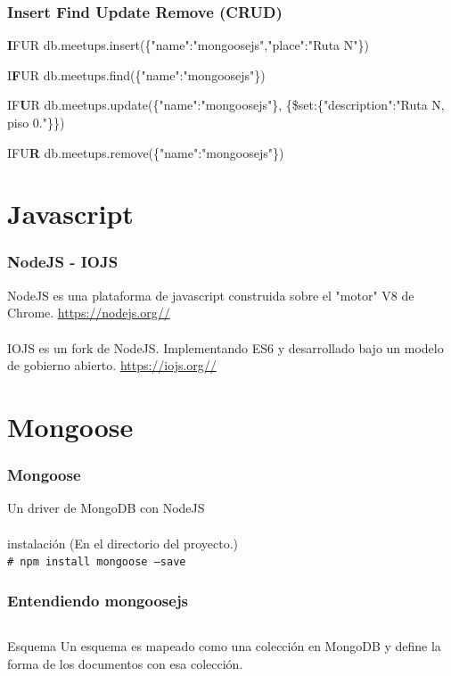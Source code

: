 \documentclass{beamer}
\begin{document}
\begin{frame}
\frametitle{Insert Find Update Remove (CRUD)}
\pause
\begin{block}{\textbf{I}FUR}
db.meetups.insert(\{"name":"mongoosejs","place":"Ruta N"\})
\end{block}
\pause
\begin{block}{I\textbf{F}UR}
db.meetups.find(\{"name":"mongoosejs"\})
\end{block}
\pause
\begin{block}{IF\textbf{U}R}
db.meetups.update(\{"name":"mongoosejs"\},
\{\$set:\{"description":"Ruta N, piso 0."\}\})
\end{block}
\pause
\begin{block}{IFU\textbf{R}}
db.meetups.remove(\{"name":"mongoosejs"\})
\end{block}
\end{frame}

\section{Javascript}
\begin{frame}
\frametitle{NodeJS - IOJS}
NodeJS es una plataforma de javascript construida sobre el "motor" V8 de Chrome.
{\color{blue}\url{https://nodejs.org//}}
\pause
\\~\\
IOJS es un fork de NodeJS. Implementando ES6 y desarrollado bajo un modelo de gobierno abierto.
{\color{blue}\url{https://iojs.org//}}
\end{frame}
\section{Mongoose}
\begin{frame}[fragile]
\frametitle{Mongoose}
Un driver de MongoDB con NodeJS
\pause
\\~\\
\newcommand{\shellcmd}[1]{\\\indent\indent\texttt{\footnotesize\# #1}\\}
  \noindent instalaci\'on (En el directorio del proyecto.)
  \shellcmd{npm install mongoose --save}
\end{frame}

\begin{frame}
\frametitle{Entendiendo mongoosejs}
\begin{columns}[c]
Esquema
Un esquema es mapeado como una colecci\'on en MongoDB y 
define la forma de los documentos  con esa colecci\'on.
\end{columns}
\end{frame}
\end{document}
